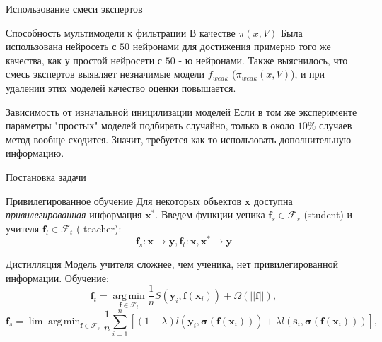 \documentclass{beamer}
\DeclareMathOperator*{\argmin}{arg\,min}
\begin{document}
\begin{frame}{Использование смеси экспертов}
\begin{block}{Способность мультимодели к фильтрации}
В качестве $\pi(x, V)$ Была использована нейросеть с $50$ нейронами для достижения примерно того же качества, как у  простой нейросети  с $50$ - ю нейронами. Также выяснилось, что смесь экспертов выявляет незначимые модели $f_{weak}$ ($\pi_{weak} (x, V)$), и при удалении этих моделей качество оценки повышается. 
\end{block}


\begin{block}{Зависимость от изначальной иницилизации моделей}
Если в том же эксперименте  параметры "простых" моделей  подбирать случайно, только в около $10 \% $ случаев метод вообще  сходится. Значит, требуется как-то использовать дополнительную информацию.
\end{block}
\end{frame}


\begin{frame}{Постановка задачи}


 \begin{block}{Привилегированное обучение}
 Для некоторых объектов $\mathbf{x}$ доступна \emph{привилегированная} информация $\mathbf{x}^*$. Введем функции уеника $\mathbf{f}_s  \in \mathcal{F}_s$ (student) и учителя $\mathbf{f}_t \in \mathcal{F}_t$ ( teacher):
 $$ \mathbf{f}_s: \mathbf{x} \rightarrow \mathbf{y},   \mathbf{f}_t: \mathbf{x}, \mathbf{x}^* \rightarrow \mathbf{y}$$
 \end{block}

\begin{block}{Дистилляция}
Модель учителя сложнее, чем ученика, нет привилегированной информации.  Обучение:
$$ \mathbf{f}_t = \argmin\limits_{\mathbf{f} \in \mathcal{F}_t} \frac{1}{n} 
S (\mathbf{y}_i, \mathbf{f}(\mathbf{x}_i)) 
+ \Omega (|| \mathbf{f}||),
$$
$$ \mathbf{f}_s = \lim\argmin_{\mathbf{f} \in \mathcal{F}_s} \frac{1}{n} \sum\limits_{i=1}^n
\left[ (1 - \lambda) l(\mathbf{y}_i, \boldsymbol{\sigma} (\mathbf{f}(\mathbf{x}_i)))  + 
 \lambda l (\mathbf{s}_i, \boldsymbol{\sigma} (\mathbf{f}(\mathbf{x}_i))) \right],$$
\end{block}

\end{frame}
\end{document}

